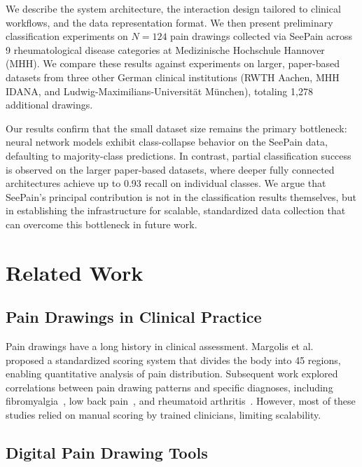 \documentclass[conference]{IEEEtran}
\begin{document}
We describe the system architecture, the interaction design tailored to clinical workflows, and the data representation format. We then present preliminary classification experiments on $N=124$ pain drawings collected via SeePain across 9 rheumatological disease categories at Medizinische Hochschule Hannover (MHH). We compare these results against experiments on larger, paper-based datasets from three other German clinical institutions (RWTH Aachen, MHH IDANA, and Ludwig-Maximilians-Universit\"at M\"unchen), totaling 1,278 additional drawings.

Our results confirm that the small dataset size remains the primary bottleneck: neural network models exhibit class-collapse behavior on the SeePain data, defaulting to majority-class predictions. In contrast, partial classification success is observed on the larger paper-based datasets, where deeper fully connected architectures achieve up to 0.93 recall on individual classes. We argue that SeePain's principal contribution is not in the classification results themselves, but in establishing the infrastructure for scalable, standardized data collection that can overcome this bottleneck in future work.

\section{Related Work}
\label{sec:related_work}

\subsection{Pain Drawings in Clinical Practice}

Pain drawings have a long history in clinical assessment. Margolis et al.~\cite{margolis1986} proposed a standardized scoring system that divides the body into 45 regions, enabling quantitative analysis of pain distribution. Subsequent work explored correlations between pain drawing patterns and specific diagnoses, including fibromyalgia~\cite{hauser2009}, low back pain~\cite{ohnmeiss1995}, and rheumatoid arthritis~\cite{thompson2002}. However, most of these studies relied on manual scoring by trained clinicians, limiting scalability.

\subsection{Digital Pain Drawing Tools}
\end{document}
